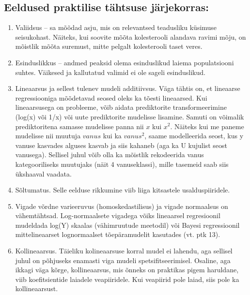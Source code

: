 \documentclass[]{book}
\begin{document}
\subsection*{Eeldused praktilise tähtsuse
järjekorras:}\label{eeldused-praktilise-tahtsuse-jarjekorras}

\begin{enumerate}
\def\labelenumi{\arabic{enumi}.}
\item
  Valiidsus -- sa mõõdad asju, mis on relevantsed teadusliku küsimuse
  seisukohast. Näiteks, kui soovite mõõta kolesterooli alandava ravimi
  mõju, on mõistlik mõõta suremust, mitte pelgalt kolesterooli taset
  veres.
\item
  Esinduslikkus -- andmed peaksid olema esinduslikud laiema
  populatsiooni suhtes. Väikesed ja kallutatud valimid ei ole sageli
  esinduslikud.
\item
  Lineaarsus ja sellest tulenev mudeli additiivsus. Väga tähtis on, et
  lineaarse regressiooniga mõõdetavad seosed oleks ka tõesti lineaarsed.
  Kui lineaarsusega on probleeme, võib aidata prediktorite
  transformeerimine (log(x) või 1/x) või uute prediktorite mudelisse
  lisamine. Samuti on võimalik prediktoritena samasse mudelisse panna
  nii \(x\) kui \(x^2\). Näiteks kui me paneme mudelisse nii muutuja
  \(vanus\) kui ka \(vanus^2\), saame modelleerida seost, kus y vanuse
  kasvades alguses kasvab ja siis kahaneb (aga ka U kujulist seost
  vanusega). Sellisel juhul võib olla ka mõistlik rekodeerida vanus
  kategooriliseks muutujaks (näit 4 vanuseklassi), mille tasemeid saab
  siis ükshaaval vaadata.
\item
  Sõltumatus. Selle eelduse rikkumine viib liiga kitsastele
  usalduspiiridele.
\item
  Vigade võrdne varieeruvus (homoskedastilisus) ja vigade normaalsus on
  vähemtähtsad. Log-normaalsete vigadega võiks lineaarsel regresioonil
  mudeldada log(Y) skaalas (vähimruutude meetodil) või Bayesi
  regressioonil mittelineaarset lognormaalset tõepäramudelit kasutades
  (vt. ptk 13).
\item
  Kollineaarsus. Täieliku kolineaarsuse korral mudel ei lahendu, aga
  sellisel juhul on põhjuseks enamasti viga mudeli spetsifitseerimisel.
  Osaline, aga ikkagi väga kõrge, kollineaarsus, mis õnneks on praktikas
  pigem haruldane, viib koefitsientide laiadele veapiiridele. Kui
  veapiirid pole laiad, siis pole ka kollineaarsust.
\end{enumerate}
\end{document}
